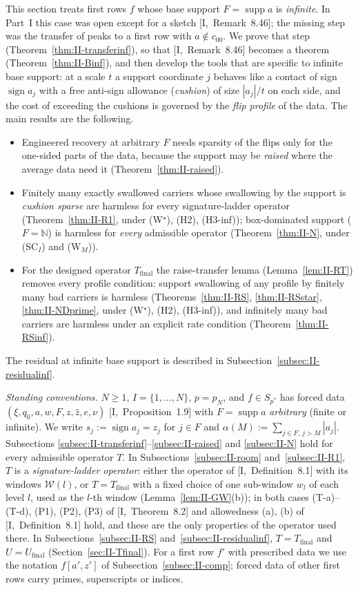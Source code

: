 \documentclass[10pt]{amsart}
\theoremstyle{definition}
\theoremstyle{remark}
\newcommand{\supp}{\operatorname{supp}}
\newcommand{\sgn}{\operatorname{sign}}
\newcommand{\N}{\mathbb N}
\newcommand{\zh}{\hat z}
\begin{document}
This section treats first rows $f$ whose base support $F=\supp a$ is
\emph{infinite}.  In Part~I this case was open except for a sketch
[I,~Remark~8.46]; the missing step was the transfer of peaks to a first row
with $a\notin c_{00}$.  We prove that step
(Theorem~\ref{thm:II-transferinf}), so that [I,~Remark~8.46] becomes a
theorem (Theorem~\ref{thm:II-Binf}), and then develop the tools that are
specific to infinite base support: at a scale $t$ a support coordinate $j$
behaves like a contact of sign $\sgn a_j$ with a free anti-sign allowance
(\emph{cushion}) of size $|a_j|/t$ on each side, and the cost of exceeding
the cushions is governed by the \emph{flip profile} of the data.  The main
results are the following.
\begin{itemize}
\item Engineered recovery at arbitrary $F$ needs sparsity of the flips only
for the one-sided parts of the data, because the support may be
\emph{raised} where the average data need it
(Theorem~\ref{thm:II-raised}).
\item Finitely many exactly swallowed carriers whose swallowing by the
support is \emph{cushion sparse} are harmless for every signature-ladder
operator (Theorem~\ref{thm:II-R1}, under (W$^\star$), (H2), (H3-inf));
box-dominated support ($F=\N$) is harmless for \emph{every} admissible
operator (Theorem~\ref{thm:II-N}, under (SC$_I$) and (W$_M$)).
\item For the designed operator $T_{\mathrm{final}}$ the raise-transfer
lemma (Lemma~\ref{lem:II-RT}) removes every profile condition: support
swallowing of any profile by finitely many bad carriers is harmless
(Theorems~\ref{thm:II-RS}, \ref{thm:II-RSstar}, \ref{thm:II-NDprime}, under
(W$^\star$), (H2), (H3-inf)), and
infinitely many bad carriers are harmless under an explicit rate condition
(Theorem~\ref{thm:II-RSinf}).
\end{itemize}
The residual at infinite base support is described in
Subsection~\ref{subsec:II-residualinf}.

\smallskip\noindent\emph{Standing conventions.}  $N\ge1$,
$I=\{1,\dots,N\}$, $p=p_N$, and $f\in S_{p^*}$ has forced data
$(\xi,q_0,a,w,F,z,\zh,e,\nu)$ [I,~Proposition~1.9] with $F=\supp a$
\emph{arbitrary} (finite or infinite).  We write $s_j:=\sgn a_j=z_j$ for
$j\in F$ and $\alpha(M):=\sum_{j\in F,\,j>M}|a_j|$.  Subsections
\ref{subsec:II-transferinf}--\ref{subsec:II-raised} and
\ref{subsec:II-N} hold for every admissible operator $T$.  In
Subsections~\ref{subsec:II-room} and~\ref{subsec:II-R1}, $T$ is a
\emph{signature-ladder operator}: either the operator of
[I,~Definition~8.1] with its windows $\mathcal W(l)$, or
$T=T_{\mathrm{final}}$ with a fixed choice of one sub-window $w_l$ of each
level $l$, used as the $l$-th window (Lemma~\ref{lem:II-GW}(b)); in both
cases (T-a)--(T-d), (P1), (P2), (P3) of [I,~Theorem~8.2] and allowedness
(a), (b) of [I,~Definition~8.1] hold, and these are the only properties
of the operator used there.  In Subsections~\ref{subsec:II-RS}
and~\ref{subsec:II-residualinf}, $T=T_{\mathrm{final}}$ and
$U=U_{\mathrm{final}}$ (Section~\ref{sec:II-Tfinal}).  For a first row
$f'$ with prescribed data we use the notation $f[a',z']$ of
Subsection~\ref{subsec:II-comp}; forced data of other first rows carry
primes, superscripts or indices.
\end{document}
